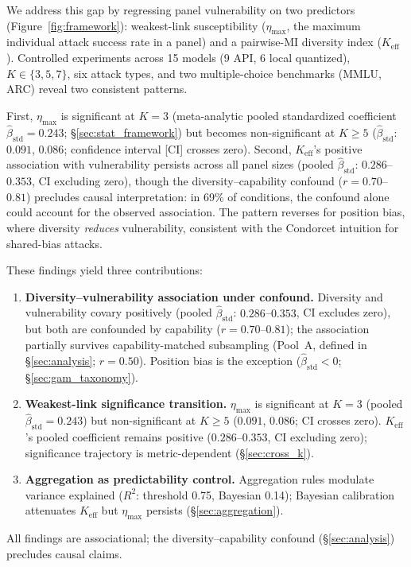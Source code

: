 We address this gap by regressing panel vulnerability on two predictors (Figure~\ref{fig:framework}): weakest-link susceptibility ($\eta_{\max}$, the maximum individual attack success rate in a panel) and a pairwise-MI diversity index ($K_{\mathrm{eff}}$). Controlled experiments across 15 models (9 API, 6 local quantized), $K \in \{3,5,7\}$, six attack types, and two multiple-choice benchmarks (MMLU, ARC) reveal two consistent patterns.

First, $\eta_{\max}$ is significant at $K{=}3$ (meta-analytic pooled standardized coefficient $\hat{\beta}_{\mathrm{std}}{=}0.243$; \S\ref{sec:stat_framework}) but becomes non-significant at $K{\geq}5$ ($\hat{\beta}_{\mathrm{std}}$: $0.091$, $0.086$; confidence interval [CI] crosses zero). Second, $K_{\mathrm{eff}}$'s positive association with vulnerability persists across all panel sizes (pooled $\hat{\beta}_{\mathrm{std}}$: $0.286$--$0.353$, CI excluding zero), though the diversity--capability confound ($r{=}0.70$--$0.81$) precludes causal interpretation: in 69\% of conditions, the confound alone could account for the observed association. The pattern reverses for position bias, where diversity \emph{reduces} vulnerability, consistent with the Condorcet intuition for shared-bias attacks.

These findings yield three contributions:
\begin{enumerate}
\item \textbf{Diversity--vulnerability association under confound.} Diversity and vulnerability covary positively (pooled $\hat{\beta}_{\mathrm{std}}$: $0.286$--$0.353$, CI excludes zero), but both are confounded by capability ($r{=}0.70$--$0.81$); the association partially survives capability-matched subsampling (Pool~A, defined in \S\ref{sec:analysis}; $r{=}0.50$). Position bias is the exception ($\hat{\beta}_{\mathrm{std}} < 0$; \S\ref{sec:gam_taxonomy}).
\item \textbf{Weakest-link significance transition.} $\eta_{\max}$ is significant at $K{=}3$ (pooled $\hat{\beta}_{\mathrm{std}}{=}0.243$) but non-significant at $K{\geq}5$ ($0.091$, $0.086$; CI crosses zero). $K_{\mathrm{eff}}$'s pooled coefficient remains positive ($0.286$--$0.353$, CI excluding zero); significance trajectory is metric-dependent (\S\ref{sec:cross_k}).
\item \textbf{Aggregation as predictability control.} Aggregation rules modulate variance explained ($R^2$: threshold 0.75, Bayesian 0.14); Bayesian calibration attenuates $K_{\mathrm{eff}}$ but $\eta_{\max}$ persists (\S\ref{sec:aggregation}).
\end{enumerate}

All findings are associational; the diversity--capability confound (\S\ref{sec:analysis}) precludes causal claims.
